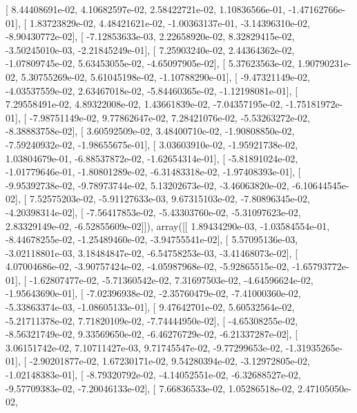 \documentclass{article}
\begin{document}
       [  8.44408691e-02,   4.10682597e-02,   2.58422721e-02,
          1.10836566e-01,  -1.47162766e-01],
       [  1.83723829e-02,   4.48421621e-02,  -1.00363137e-01,
         -3.14396310e-02,  -8.90430772e-02],
       [ -7.12853633e-03,   2.22658920e-02,   8.32829415e-02,
         -3.50245010e-03,  -2.21845249e-01],
       [  7.25903240e-02,   2.44364362e-02,  -1.07809745e-02,
          5.63453055e-02,  -4.65097905e-02],
       [  5.37623563e-02,   1.90790231e-02,   5.30755269e-02,
          5.61045198e-02,  -1.10788290e-01],
       [ -9.47321149e-02,  -4.03537559e-02,   2.63467018e-02,
         -5.84460365e-02,  -1.12198081e-01],
       [  7.29558491e-02,   4.89322008e-02,   1.43661839e-02,
         -7.04357195e-02,  -1.75181972e-01],
       [ -7.98751149e-02,   9.77862647e-02,   7.28421076e-02,
         -5.53263272e-02,  -8.38883758e-02],
       [  3.60592509e-02,   3.48400710e-02,  -1.90808850e-02,
         -7.59240932e-02,  -1.98655675e-01],
       [  3.03603910e-02,  -1.95921738e-02,   1.03804679e-01,
         -6.88537872e-02,  -1.62654314e-01],
       [ -5.81891024e-02,  -1.01779646e-01,  -1.80801289e-02,
         -6.31483318e-02,  -1.97408393e-01],
       [ -9.95392738e-02,  -9.78973744e-02,   5.13202673e-02,
         -3.46063820e-02,  -6.10644545e-02],
       [  7.52575203e-02,  -5.91127633e-03,   9.67315103e-02,
         -7.80896345e-02,  -4.20398314e-02],
       [ -7.56417853e-02,  -5.43303760e-02,  -5.31097623e-02,
          2.83329149e-02,  -6.52855609e-02]]), array([[  1.89434290e-03,  -1.03584554e-01,  -8.44678255e-02,
         -1.25489460e-02,  -3.94755541e-02],
       [  5.57095136e-03,  -3.02118801e-03,   3.18484847e-02,
         -6.54758253e-03,  -3.41468073e-02],
       [  4.07004686e-02,  -3.90757424e-02,  -4.05987968e-02,
         -5.92865515e-02,  -1.65793772e-01],
       [ -1.62807477e-02,  -5.71360542e-02,   7.31697503e-02,
         -4.64596624e-02,  -1.95643690e-01],
       [ -7.02396938e-02,  -2.35760479e-02,  -7.41000360e-02,
         -5.33863374e-03,  -1.08605133e-01],
       [  9.47642701e-02,   5.60532564e-02,  -5.21711378e-02,
          7.71820109e-02,  -7.74444950e-02],
       [ -4.65308255e-02,  -8.56321749e-02,   9.33569650e-02,
         -6.46276729e-02,  -6.21337287e-02],
       [  3.06151742e-02,   7.10711427e-03,   9.71745547e-02,
         -9.77299653e-02,  -1.31935265e-01],
       [ -2.90201877e-02,   1.67230171e-02,   9.54280394e-02,
         -3.12972805e-02,  -1.02148383e-01],
       [ -8.79320792e-02,  -4.14052551e-02,  -6.32688527e-02,
         -9.57709383e-02,  -7.20046133e-02],
       [  7.66836533e-02,   1.05286518e-02,   2.47105050e-02,
\end{document}

